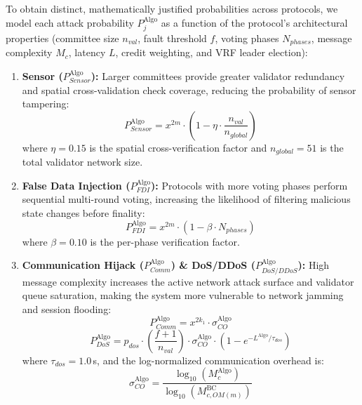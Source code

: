 \documentclass[10pt,twocolumn,journal]{IEEEtran}
\begin{document}
To obtain distinct, mathematically justified probabilities across protocols, we model each attack probability $P_j^{\text{Algo}}$ as a function of the protocol's architectural properties (committee size $n_{val}$, fault threshold $f$, voting phases $N_{phases}$, message complexity $M_c$, latency $L$, credit weighting, and VRF leader election):
\begin{enumerate}[leftmargin=*]
    \item \textbf{Sensor ($P_{Sensor}^{\text{Algo}}$):} Larger committees provide greater validator redundancy and spatial cross-validation check coverage, reducing the probability of sensor tampering:
    \begin{equation}
    P_{Sensor}^{\text{Algo}} = x^{2m} \cdot \left(1 - \eta \cdot \frac{n_{val}}{n_{global}}\right)
    \end{equation}
    where $\eta = 0.15$ is the spatial cross-verification factor and $n_{global}=51$ is the total validator network size.
    
    \item \textbf{False Data Injection ($P_{FDI}^{\text{Algo}}$):} Protocols with more voting phases perform sequential multi-round voting, increasing the likelihood of filtering malicious state changes before finality:
    \begin{equation}
    P_{FDI}^{\text{Algo}} = x^{2m} \cdot \left(1 - \beta \cdot N_{phases}\right)
    \end{equation}
    where $\beta = 0.10$ is the per-phase verification factor.
    
    \item \textbf{Communication Hijack ($P_{Comm}^{\text{Algo}}$) \& DoS/DDoS ($P_{DoS/DDoS}^{\text{Algo}}$):} High message complexity increases the active network attack surface and validator queue saturation, making the system more vulnerable to network jamming and session flooding:
    \begin{equation}
    P_{Comm}^{\text{Algo}} = x^{2k_1} \cdot \sigma_{CO}^{\text{Algo}}
    \end{equation}
    \begin{equation}
    P_{DoS}^{\text{Algo}} = p_{dos} \cdot \left(\frac{f+1}{n_{val}}\right) \cdot \sigma_{CO}^{\text{Algo}} \cdot \left(1 - e^{-L^{\text{Algo}} / \tau_{dos}}\right)
    \end{equation}
    where $\tau_{dos}=1.0$\,s, and the log-normalized communication overhead is:
    \begin{equation}
    \sigma_{CO}^{\text{Algo}} = \frac{\log_{10}(M_c^{\text{Algo}})}{\log_{10}(M_{c,OM(m)}^{\text{BC}})}
    \end{equation}
    

\end{enumerate}
\end{document}
